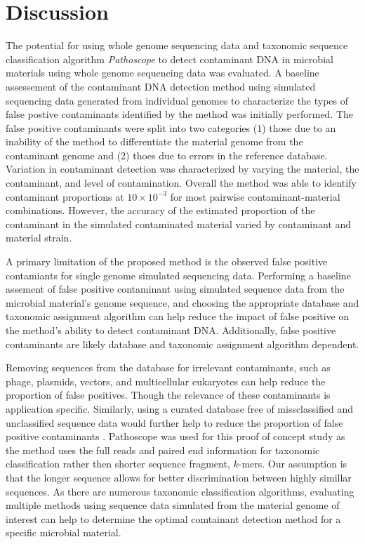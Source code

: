 \documentclass[fleqn,10pt,lineno]{wlpeerj}\usepackage[]{graphicx}\usepackage[]{color}
\begin{document}
\section*{Discussion}

The potential for using whole genome sequencing data and taxonomic sequence classification algorithm \textit{Pathoscope} to detect contaminant DNA in microbial materials using whole genome sequencing data was evaluated. 
A baseline assessement of the contaminant DNA detection method using simulated sequencing data generated from individual genomes to characterize the types of false postive contaminants identified by the method was initially performed. 
The false positive contaminants were split into two categories (1) those due to an inability of the method to differentiate the material genome from the contaminant genome and (2) thoes due to errors in the reference database. 
Variation in contaminant detection was characterized by varying the material, the contaminant, and level of contamination. 
Overall the method was able to identify contaminant proportions at $10 \times 10^{-3}$ for most pairwise contaminant-material combinations. 
However, the accuracy of the estimated proportion of the contaminant in the simulated contaminated material varied by contaminant and material strain. 

A primary limitation of the proposed method is the observed false positive contamiants for single genome simulated sequencing data. 
Performing a baseline assement of false positive contaminant using simulated sequence data from the microbial material's genome sequence, 
and choosing the appropriate database and taxonomic assignment algorithm can help reduce the impact of false positive on the method's ability to detect contaminant DNA. 
Additionally, false positive contaminants are likely database and taxonomic assignment algorithm dependent. 

Removing sequences from the database for irrelevant contaminants, such as phage, plasmids, vectors, and multicellular eukaryotes can help reduce the proportion of false positives. 
Though the relevance of these contaminants is application specific. 
Similarly, using a curated database free of missclassified and unclassified sequence data would further help to reduce the proportion of false positive contaminants \citep{tennessen2015prodege}. 
Pathoscope was used for this proof of concept study as the method uses the full reads and paired end information for taxonomic classification rather then shorter sequence fragment, $k$-mers. 
Our assumption is that the longer sequence allows for better discrimination between highly simillar sequences. 
As there are numerous taxonomic classification algorithms, evaluating multiple methods using sequence data simulated from the material genome of interest can help to determine the optimal comtainant detection method for a specific microbial material. 
\end{document}
